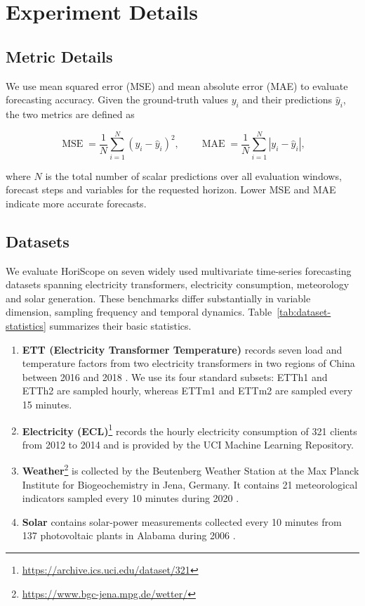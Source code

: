 \setcounter{table}{0}
\setcounter{figure}{0}
\section{Experiment Details}
\label{app:experiment-details}


\subsection{Metric Details}


We use mean squared error (MSE) and mean absolute error (MAE) to evaluate forecasting accuracy. Given the ground-truth values $y_i$ and their predictions $\widehat y_i$, the two metrics are defined as

\[
\operatorname{MSE}
=
\frac{1}{N}
\sum_{i=1}^{N}
\left(y_i-\widehat y_i\right)^2,
\qquad
\operatorname{MAE}
=
\frac{1}{N}
\sum_{i=1}^{N}
\left|y_i-\widehat y_i\right|,
\]


where $N$ is the total number of scalar predictions over all evaluation windows, forecast steps and variables for the requested horizon. Lower MSE and MAE indicate more accurate forecasts.

\subsection{Datasets}


We evaluate HoriScope on seven widely used multivariate time-series forecasting datasets spanning electricity transformers, electricity consumption, meteorology and solar generation. These benchmarks differ substantially in variable dimension, sampling frequency and temporal dynamics. Table~\ref{tab:dataset-statistics} summarizes their basic statistics.

\begin{enumerate}
\item \textbf{ETT (Electricity Transformer Temperature)} records seven load and temperature factors from two electricity transformers in two regions of China between 2016 and 2018 \citep{zhou2021informer}. We use its four standard subsets: ETTh1 and ETTh2 are sampled hourly, whereas ETTm1 and ETTm2 are sampled every 15 minutes.
\item \textbf{Electricity (ECL)}\footnote{\url{https://archive.ics.uci.edu/dataset/321}} records the hourly electricity consumption of 321 clients from 2012 to 2014 and is provided by the UCI Machine Learning Repository.
\item \textbf{Weather}\footnote{\url{https://www.bgc-jena.mpg.de/wetter/}} is collected by the Beutenberg Weather Station at the Max Planck Institute for Biogeochemistry in Jena, Germany. It contains 21 meteorological indicators sampled every 10 minutes during 2020 \citep{wu2023timesnet}.
\item \textbf{Solar} contains solar-power measurements collected every 10 minutes from 137 photovoltaic plants in Alabama during 2006 \citep{lai2018lstnet}.
\end{enumerate}

